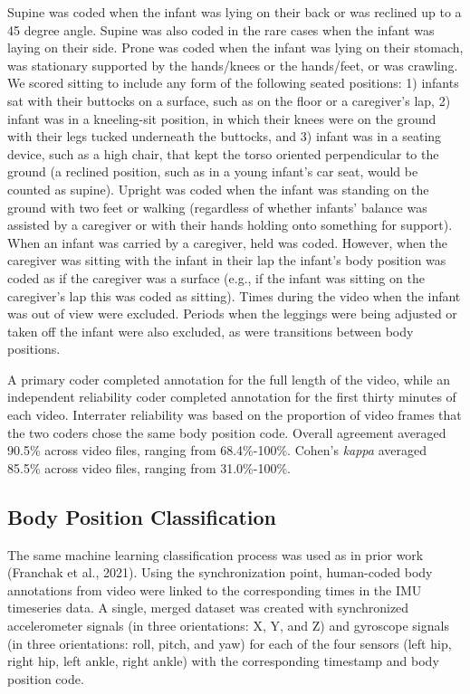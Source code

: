 \documentclass[
  man]{apa6}
\begin{document}
Supine was coded when the infant was lying on their back or was reclined up to a 45 degree angle. Supine was also coded in the rare cases when the infant was laying on their side. Prone was coded when the infant was lying on their stomach, was stationary supported by the hands/knees or the hands/feet, or was crawling. We scored sitting to include any form of the following seated positions: 1) infants sat with their buttocks on a surface, such as on the floor or a caregiver's lap, 2) infant was in a kneeling-sit position, in which their knees were on the ground with their legs tucked underneath the buttocks, and 3) infant was in a seating device, such as a high chair, that kept the torso oriented perpendicular to the ground (a reclined position, such as in a young infant's car seat, would be counted as supine). Upright was coded when the infant was standing on the ground with two feet or walking (regardless of whether infants' balance was assisted by a caregiver or with their hands holding onto something for support). When an infant was carried by a caregiver, held was coded. However, when the caregiver was sitting with the infant in their lap the infant's body position was coded as if the caregiver was a surface (e.g., if the infant was sitting on the caregiver's lap this was coded as sitting). Times during the video when the infant was out of view were excluded. Periods when the leggings were being adjusted or taken off the infant were also excluded, as were transitions between body positions.

A primary coder completed annotation for the full length of the video, while an independent reliability coder completed annotation for the first thirty minutes of each video. Interrater reliability was based on the proportion of video frames that the two coders chose the same body position code. Overall agreement averaged 90.5\% across video files, ranging from 68.4\%-100\%. Cohen's \emph{kappa} averaged 85.5\% across video files, ranging from 31.0\%-100\%.

\hypertarget{body-position-classification}{%
\subsection{Body Position Classification}\label{body-position-classification}}

The same machine learning classification process was used as in prior work (Franchak et al., 2021). Using the synchronization point, human-coded body annotations from video were linked to the corresponding times in the IMU timeseries data. A single, merged dataset was created with synchronized accelerometer signals (in three orientations: X, Y, and Z) and gyroscope signals (in three orientations: roll, pitch, and yaw) for each of the four sensors (left hip, right hip, left ankle, right ankle) with the corresponding timestamp and body position code.
\end{document}
